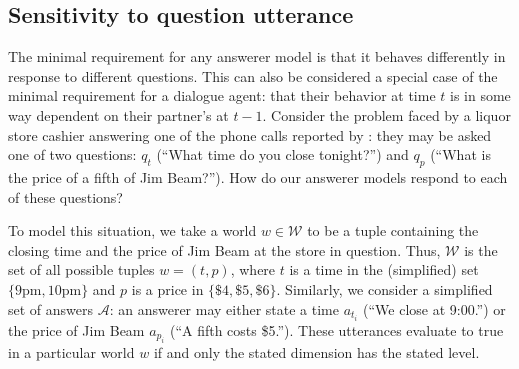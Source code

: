 \documentclass[12pt, floatsintext, jou]{apa6}
\begin{document}

\subsection{Sensitivity to question utterance}

The minimal requirement for any answerer model is that it behaves differently in response to different questions. This can also be considered a special case of the minimal requirement for a dialogue agent: that their behavior at time $t$ is in some way dependent on their partner's at $t-1$. %
Consider the problem faced by a liquor store cashier answering one of the phone calls reported by : they may be asked one of two questions: $q_t$ (``What time do you close tonight?'') and $q_p$ (``What is the price of a fifth of Jim Beam?''). How do our answerer models respond to each of these questions?

To model this situation, we take a world $w \in \mathcal{W}$ to be a tuple containing the closing time and the price of Jim Beam at the store in question. Thus, $\mathcal{W}$ is the set of all possible tuples $w = (t, p)$, where $t$ is a time in the (simplified) set $\{9\textrm{pm},10\textrm{pm}\}$ and $p$ is a price in $\{\$4, \$5, \$6\}$. Similarly, we consider a simplified set of answers $\mathcal{A}$: an answerer may either state a time $a_{t_i}$ (``We close at 9:00.'') or the price of Jim Beam $a_{p_i}$  (``A fifth costs \$5.''). These utterances evaluate to true in a particular world $w$ if and only the stated dimension has the stated level.
\end{document}
